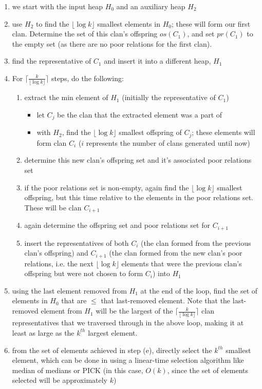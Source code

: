 \documentclass[12pt]{article}
\begin{document}
\begin{enumerate}
    \begin{enumerate}
        \item we start with the input heap $H_0$ and an auxiliary heap $H_2$
        \item use $H_2$ to find the $\lfloor \log k \rfloor$ smallest elements in $H_0$; these will form our first clan. 
        Determine the set of this clan's offspring $os(C_1)$, and set $pr(C_1)$ to the empty set (as there are no 
        poor relations for the first clan).
        \item find the representative of $C_1$ and insert it into a different heap, $H_1$
        \item For $\lceil \frac{k}{\lfloor \log k \rfloor} \rceil$ steps, do the following:
        \begin{enumerate}
            \item extract the min element of $H_1$ (initially the representative of $C_1$)
            \begin{itemize}
                \item let $C_j$ be the clan that the extracted element was a part of
                \item with $H_2$, find the $\lfloor \log k \rfloor$ smallest offspring of $C_j$; these elements will form 
                clan $C_i$ ($i$ represents the number of clans generated until now)
            \end{itemize}
            \item determine this new clan's offspring set and it's associated poor relations set
            \item if the poor relations set is non-empty, again find the $\lfloor \log k \rfloor$ smallest offspring, but 
            this time relative to the elements in the poor relations set. These will be clan $C_{i + 1}$
            \item again determine the offspring set and poor relations set for $C_{i + 1}$
            \item insert the representatives of both $C_i$ (the clan formed from the previous clan's offspring) and 
            $C_{i + 1}$ (the clan formed from the new clan's poor relations, i.e. the next $\lfloor \log k \rfloor$ elements 
            that were the previous clan's offspring but were not chosen to form $C_i$) into $H_1$
        \end{enumerate}
        \item using the last element removed from $H_1$ at the end of the loop, find the set of elements in $H_0$ that 
        are $\leq$ that last-removed element. Note that the last-removed element from $H_1$ will be the largest of the 
        $\lceil \frac{k}{\lfloor \log k \rfloor} \rceil$ clan representatives that we traversed through in the above loop, 
        making it at least as large as the $k^{th}$ largest element.
        \item from the set of elements achieved in step (e), directly select the $k^{th}$ smallest element, which can be done in 
        using a linear-time selection algorithm like median of medians or PICK (in this case, $O(k)$, since the set of elements selected will be approximately $k$)
    \end{enumerate}


\end{enumerate}
\end{document}
